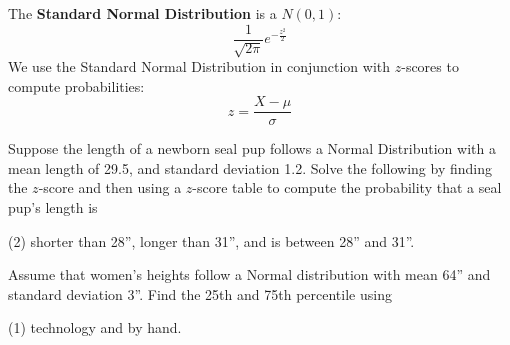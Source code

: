 \documentclass[../mathNotesPreamble]{subfiles}
\begin{document}
  \begin{defn*}
    The \textbf{Standard Normal Distribution} is a $N(0,1)$: 
      \[\frac{1}{\sqrt{2\pi}} e^{-\frac{z^2}{2}}\]
    We use the Standard Normal Distribution in conjunction with $z$-scores to compute probabilities:
      \[z=\frac{X-\mu}{\sigma}\]
  \end{defn*}
  \begin{ex*}
    Suppose the length of a newborn seal pup follows a Normal Distribution with a mean length of 29.5, and standard deviation 1.2. Solve the following by finding the $z$-score and then using a $z$-score table to compute the probability that a seal pup's length is
  \end{ex*}
  \begin{extasks}[after-item-skip=\stretch{1}](2)
    \task shorter than 28'',
    \task longer than 31'', and
    \task is between 28'' and 31''.
  \end{extasks}
  \pagebreak
  
  \begin{ex*}
    Assume that women's heights follow a Normal distribution with mean 64'' and standard deviation 3''. Find the 25th and 75th percentile using 
  \end{ex*}
  \begin{extasks}[after-item-skip=\stretch{1}](1)
    \task technology and
    \task by hand.
  \end{extasks}

  \pagebreak
\end{document}
